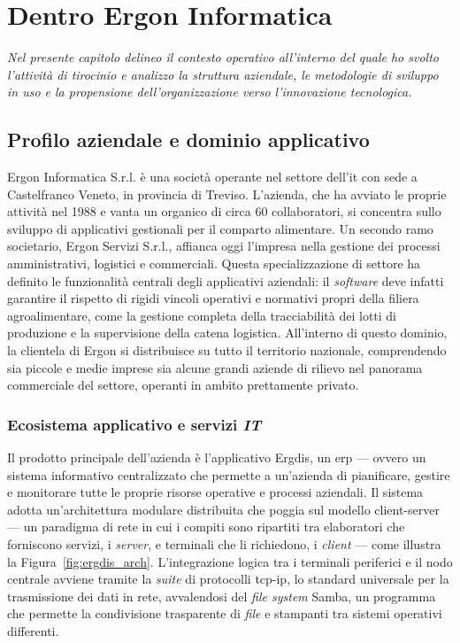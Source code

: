 \chapter{Dentro Ergon Informatica}
\label{chap:introduzione}

\textit{Nel presente capitolo delineo il contesto operativo all'interno del quale ho svolto l'attività di tirocinio e analizzo la struttura aziendale, le metodologie di sviluppo in uso e la propensione dell'organizzazione verso l'innovazione tecnologica.}

\section{Profilo aziendale e dominio applicativo}
\label{sec:profilo_aziendale}

Ergon Informatica S.r.l. è una società operante nel settore dell'\gls{it} con sede a Castelfranco Veneto, in provincia di Treviso. L'azienda, che ha avviato le proprie attività nel 1988 e vanta un organico di circa 60 collaboratori, si concentra sullo sviluppo di applicativi gestionali per il comparto alimentare. Un secondo ramo societario, Ergon Servizi S.r.l., affianca oggi l'impresa nella gestione dei processi amministrativi, logistici e commerciali. Questa specializzazione di settore ha definito le funzionalità centrali degli applicativi aziendali: il \textit{software} deve infatti garantire il rispetto di rigidi vincoli operativi e normativi propri della filiera agroalimentare, come la gestione completa della tracciabilità dei lotti di produzione e la supervisione della catena logistica. All'interno di questo dominio, la clientela di Ergon si distribuisce su tutto il territorio nazionale, comprendendo sia piccole e medie imprese sia alcune grandi aziende di rilievo nel panorama commerciale del settore, operanti in ambito prettamente privato.

\subsection{Ecosistema applicativo e servizi \textit{IT}}
\label{subsec:ecosistema_applicativo}

Il prodotto principale dell'azienda è l'applicativo Ergdis, un \gls{erp} --- ovvero un sistema informativo centralizzato che permette a un'azienda di pianificare, gestire e monitorare tutte le proprie risorse operative e processi aziendali. Il sistema adotta un'architettura modulare distribuita che poggia sul modello \gls{client-server} --- un paradigma di rete in cui i compiti sono ripartiti tra elaboratori che forniscono servizi, i \textit{server}, e terminali che li richiedono, i \textit{client} --- come illustra la Figura~\ref{fig:ergdis_arch}. L'integrazione logica tra i terminali periferici e il nodo centrale avviene tramite la \textit{suite} di protocolli \gls{tcp-ip}, lo standard universale per la trasmissione dei dati in rete, avvalendosi del \textit{file system} Samba, un programma che permette la condivisione trasparente di \textit{file} e stampanti tra sistemi operativi differenti.

